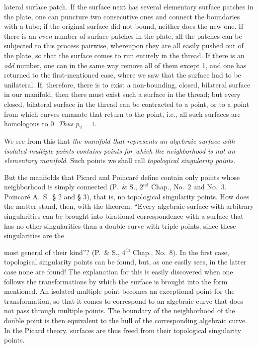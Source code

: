 \documentclass{article}
\begin{document}
lateral surface patch. If the surface next has several elementary surface patches in the plate, one can puncture two consecutive ones and connect the boundaries with a tube; if the original surface did not bound, neither does the new one. If there is an \emph{even} number of surface patches in the plate, all the patches can be subjected to this process pairwise, whereupon they are all easily pushed out of the plate, so that the surface comes to run entirely in the thread. If there is an \emph{odd} number, one can in the same way remove all of them except 1, and one has returned to the first-mentioned case, where we saw that the surface had to be unilateral. If, therefore, there is to exist a non-bounding, closed, bilateral surface in our manifold, then there must exist such a surface in the thread; but every closed, bilateral surface in the thread can be contracted to a point, or to a point from which curves emanate that return to the point, i.e., all such surfaces are homologous to 0. \emph{Thus $p_2 = 1$}.

We see from this that \emph{the manifold that represents an algebraic surface with isolated multiple points contains points for which the neighborhood is not an elementary manifold}. Such points we shall call \emph{topological singularity points}.

But the manifolds that Picard and Poincaré define contain only points whose neighborhood is simply connected (P.\ \& S., $2^{\text{nd}}$ Chap., No.\ 2 and No.\ 3. Poincaré A.\ S.\ § 2 and § 3), that is, no topological singularity points. How does the matter stand, then, with the theorem: ``Every algebraic surface with arbitrary singularities can be brought into birational correspondence with a surface that has no other singularities than a double curve with triple points, since these singularities are the

most general of their kind''? (P.\ \& S., $4^{\text{th}}$ Chap., No.\ 8). In the first case, topological singularity points can be found, but, as one easily sees, in the latter case none are found! The explanation for this is easily discovered when one follows the transformations by which the surface is brought into the form mentioned. An isolated multiple point becomes an exceptional point for the transformation, so that it comes to correspond to an algebraic curve that does not pass through multiple points. The boundary of the neighborhood of the double point is then equivalent to the hull of the corresponding algebraic curve. In the Picard theory, surfaces are thus freed from their topological singularity points.
\end{document}
